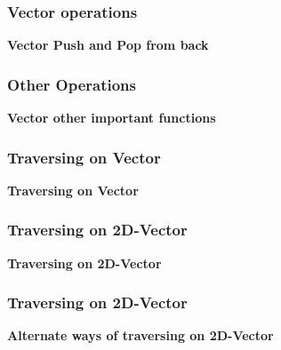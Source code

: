 \begin{frame}
    \frametitle{Vector operations}
    \textbf{Vector Push and Pop from back}

    

\end{frame}

\begin{frame}
    \frametitle{Other Operations}
    \textbf{Vector other important functions}

    

\end{frame}

\begin{frame}
    \frametitle{Traversing on Vector}
    \textbf{Traversing on Vector}

    
    
\end{frame}

\begin{frame}
    \frametitle{Traversing on 2D-Vector}
    \textbf{Traversing on 2D-Vector}

    
    
\end{frame}

\begin{frame}
    \frametitle{Traversing on 2D-Vector}
    \textbf{Alternate ways of traversing on 2D-Vector}

    
    
\end{frame}
